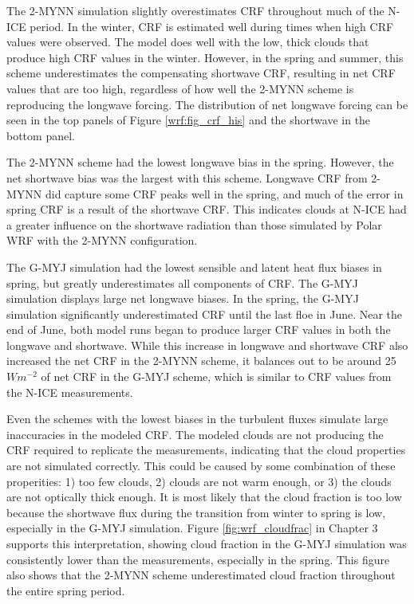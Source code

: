 The 2-MYNN simulation slightly overestimates CRF throughout much of the N-ICE period. In the winter, CRF is estimated well during times when high CRF values were observed. The model does well with the low, thick clouds that produce high CRF values in the winter. However, in the spring and summer, this scheme underestimates the compensating shortwave CRF, resulting in net CRF values that are too high, regardless of how well the 2-MYNN scheme is reproducing the longwave forcing. The distribution of net longwave forcing can be seen in the top panels of Figure \ref{wrf:fig_crf_his} and the shortwave in the bottom panel.

The 2-MYNN scheme had the lowest longwave bias in the spring. However, the net shortwave bias was the largest with this scheme. Longwave CRF from 2-MYNN did capture some CRF peaks well in the spring, and much of the error in spring CRF is a result of the shortwave CRF. This indicates clouds at N-ICE had a greater influence on the shortwave radiation than those simulated by Polar WRF with the 2-MYNN configuration.

The G-MYJ simulation had the lowest sensible and latent heat flux biases in spring, but greatly underestimates all components of CRF. The G-MYJ simulation displays large net longwave biases. In the spring, the G-MYJ simulation significantly underestimated CRF until the last floe in June. Near the end of June, both model runs began to produce larger CRF values in both the longwave and shortwave. While this increase in longwave and shortwave CRF also increased the net CRF in the 2-MYNN scheme, it balances out to be around 25 $Wm^{-2}$ of net CRF in the G-MYJ scheme, which is similar to CRF values from the N-ICE measurements.

Even the schemes with the lowest biases in the turbulent fluxes simulate large inaccuracies in the modeled CRF. The modeled clouds are not producing the CRF required to replicate the measurements, indicating that the cloud properties are not simulated correctly. This could be caused by some combination of these properities: 1) too few clouds, 2) clouds are not warm enough, or 3) the clouds are not optically thick enough. It is most likely that the cloud fraction is too low because the shortwave flux during the transition from winter to spring is low, especially in the G-MYJ simulation. Figure \ref{fig:wrf_cloudfrac} in Chapter 3 supports this interpretation, showing cloud fraction in the G-MYJ simulation was consistently lower than the measurements, especially in the spring. This figure also shows that the 2-MYNN scheme underestimated cloud fraction throughout the entire spring period.

